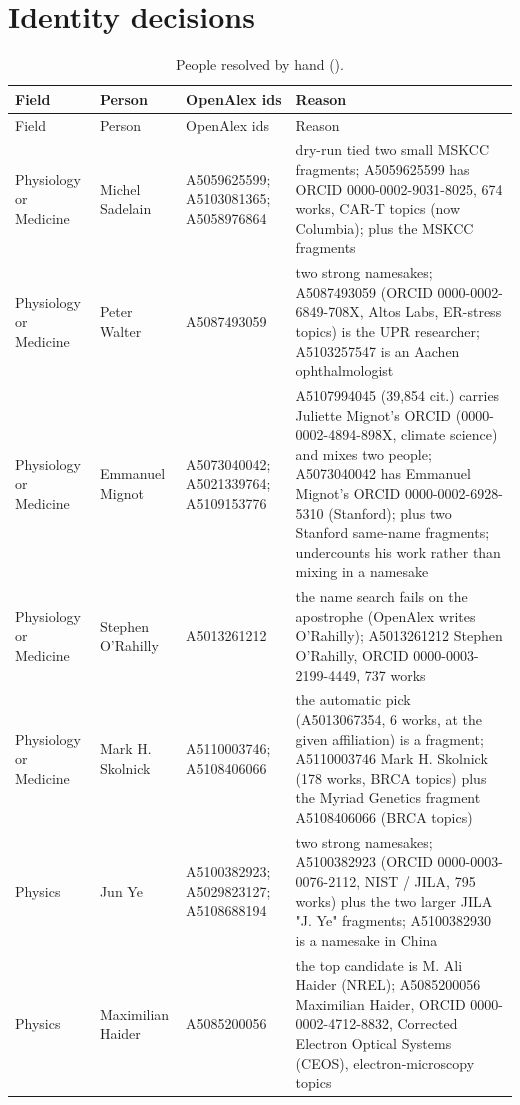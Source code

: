 \documentclass[11pt]{article}
\newcommand{\code}[1]{\texttt{\detokenize{#1}}}
\begin{document}
\section{Identity decisions}\label{app:identity}
\begin{footnotesize}
\begin{longtable}{p{2.1cm}p{2.9cm}p{3.6cm}p{6.2cm}}
\caption{People resolved by hand (\code{people/<field>_choices.yaml}).}\\\toprule
Field & Person & OpenAlex ids & Reason\\\midrule\endfirsthead
\toprule Field & Person & OpenAlex ids & Reason\\\midrule\endhead
Physiology or Medicine & Michel Sadelain & A5059625599; A5103081365; A5058976864 & dry-run tied two small MSKCC fragments; A5059625599 has ORCID 0000-0002-9031-8025, 674 works, CAR-T topics (now Columbia); plus the MSKCC fragments\\
Physiology or Medicine & Peter Walter & A5087493059 & two strong namesakes; A5087493059 (ORCID 0000-0002-6849-708X, Altos Labs, ER-stress topics) is the UPR researcher; A5103257547 is an Aachen ophthalmologist\\
Physiology or Medicine & Emmanuel Mignot & A5073040042; A5021339764; A5109153776 & A5107994045 (39,854 cit.) carries Juliette Mignot's ORCID (0000-0002-4894-898X, climate science) and mixes two people; A5073040042 has Emmanuel Mignot's ORCID 0000-0002-6928-5310 (Stanford); plus two Stanford same-name fragments; undercounts his work rather than mixing in a namesake\\
Physiology or Medicine & Stephen O'Rahilly & A5013261212 & the name search fails on the apostrophe (OpenAlex writes O'Rahilly); A5013261212 Stephen O'Rahilly, ORCID 0000-0003-2199-4449, 737 works\\
Physiology or Medicine & Mark H. Skolnick & A5110003746; A5108406066 & the automatic pick (A5013067354, 6 works, at the given affiliation) is a fragment; A5110003746 Mark H. Skolnick (178 works, BRCA topics) plus the Myriad Genetics fragment A5108406066 (BRCA topics)\\
Physics & Jun Ye & A5100382923; A5029823127; A5108688194 & two strong namesakes; A5100382923 (ORCID 0000-0003-0076-2112, NIST / JILA, 795 works) plus the two larger JILA "J. Ye" fragments; A5100382930 is a namesake in China\\
Physics & Maximilian Haider & A5085200056 & the top candidate is M. Ali Haider (NREL); A5085200056 Maximilian Haider, ORCID 0000-0002-4712-8832, Corrected Electron Optical Systems (CEOS), electron-microscopy topics\\

\end{longtable}
\end{footnotesize}
\end{document}
